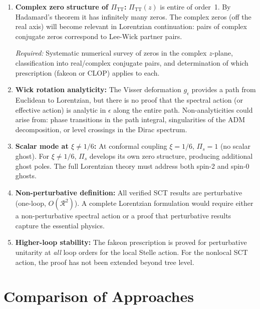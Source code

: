\documentclass[12pt,a4paper]{article}
\theoremstyle{definition}
\theoremstyle{remark}
\begin{document}
\begin{enumerate}[label=\textbf{G\arabic*.}]
\item \textbf{Complex zero structure of $\Pi_{\mathrm{TT}}$:}
  \label{gap:complex-zeros}
  $\Pi_{\mathrm{TT}}(z)$ is entire of order~1.  By Hadamard's theorem
  it has infinitely many zeros.  The complex zeros (off the real axis)
  will become relevant in Lorentzian continuation: pairs of complex
  conjugate zeros correspond to Lee-Wick partner pairs.

  \emph{Required:} Systematic numerical survey of zeros in the complex
  $z$-plane, classification into real/complex conjugate pairs, and
  determination of which prescription (fakeon or CLOP) applies to each.

\item \textbf{Wick rotation analyticity:}
  \label{gap:wick-analyticity}
  The Visser deformation $g_\epsilon$ provides a path from Euclidean
  to Lorentzian, but there is no proof that the spectral action
  (or effective action) is analytic in $\epsilon$ along the entire
  path.  Non-analyticities could arise from: phase transitions in the
  path integral, singularities of the ADM decomposition, or level
  crossings in the Dirac spectrum.

\item \textbf{Scalar mode at $\xi \neq 1/6$:}
  \label{gap:scalar}
  At conformal coupling $\xi = 1/6$, $\Pi_s = 1$ (no scalar ghost).
  For $\xi \neq 1/6$, $\Pi_s$ develops its own zero structure, producing
  additional ghost poles.  The full Lorentzian theory must address both
  spin-2 and spin-0 ghosts.

\item \textbf{Non-perturbative definition:}
  \label{gap:nonpert}
  All verified SCT results are perturbative (one-loop,
  $O(\mathcal{R}^2)$).  A complete Lorentzian formulation would
  require either a non-perturbative spectral action or a proof that
  perturbative results capture the essential physics.

\item \textbf{Higher-loop stability:}
  \label{gap:higher-loop}
  The fakeon prescription is proved for perturbative unitarity at
  \emph{all} loop orders for the local Stelle action.  For the
  nonlocal SCT action, the proof has not been extended beyond tree
  level.
\end{enumerate}


\section{Comparison of Approaches}
\label{sec:comparison}
\end{document}
